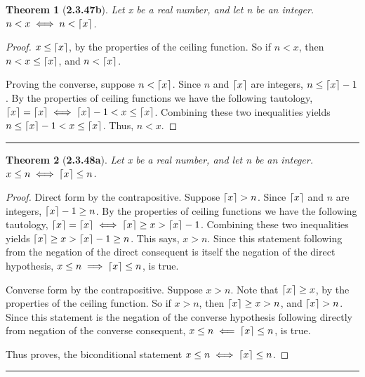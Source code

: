 \documentclass[a4paper, 12pt]{article}
\theoremstyle{plain}
\newtheorem*{theorem*}{Theorem}
\DeclarePairedDelimiter{\ceil}{\lceil}{\rceil}
\begin{document}
\pagebreak


\begin{theorem*}[\textbf{2.3.47b}]
    Let x be a real number, and let n be an integer. \newline $n < x \iff n < \ceil{x}$.
\end{theorem*}

\begin{proof}
    $x \le \ceil{x}$, by the properties of the ceiling function. So if $n < x$, then 
    $n < x \le \ceil{x}$, and $n < \ceil{x}$.
    
    Proving the converse, suppose $n < \ceil{x}$. Since $n$ and $\ceil{x}$ are integers, 
    $n \le \ceil{x} - 1$. By the properties of ceiling functions we have the following 
    tautology, $\ceil{x} = \ceil{x} \iff \ceil{x} - 1 < x \le \ceil{x}$. Combining these 
    two inequalities yields $n \le \ceil{x} - 1 < x \le \ceil{x}$. Thus, $n < x$.
\end{proof}
\begin{center}
    \rule{5.4in}{1pt}
\end{center}


\begin{theorem*}[\textbf{2.3.48a}]
    Let x be a real number, and let n be an integer. \newline $x \le n \iff \ceil{x} \le n$.
\end{theorem*}

\begin{proof}
    Direct form by the contrapositive. Suppose $\ceil{x} > n$. Since $\ceil{x}$ and $n$ are 
    integers, $\ceil{x} - 1 \ge n$. By the properties of ceiling functions we have the 
    following tautology, $\ceil{x} = \ceil{x} \iff \ceil{x} \ge x > \ceil{x} - 1$. Combining 
    these two inequalities yields $\ceil{x} \ge x > \ceil{x} - 1 \ge n$. This says, $x > n$. 
    Since this statement following from the negation of the direct consequent is itself the 
    negation of the direct hypothesis, $x \le n \implies \ceil{x} \le n$, is true.
    
    Converse form by the contrapositive. Suppose $x > n$. Note that $\ceil{x} \ge x$, by the 
    properties of the ceiling function. So if $x > n$, then $\ceil{x} \ge x > n$, and 
    $\ceil{x} > n$. Since this statement is the negation of the converse hypothesis following 
    directly from negation of the converse consequent, \newline 
    $x \le n \impliedby \ceil{x} \le n$, is true.
    
    Thus proves, the biconditional statement $x \le n \iff \ceil{x} \le n$. 
\end{proof}
\begin{center}
    \rule{5.4in}{1pt}
\end{center}
\end{document}
